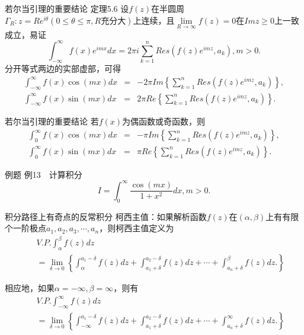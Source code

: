 \documentclass[11pt]{beamer}
\begin{document}
\begin{frame}{若尔当引理的重要结论}
定理5.6 设$f(z)$在半圆周$\Gamma_R : z=Re^{i\theta}(0 \leq \theta \leq \pi, R \text{充分大})$上连续，且$\lim\limits_{R \rightarrow \infty} f(z) = 0$在$Im z \geq 0$上一致成立，易证
\begin{equation}
\int^\infty_{-\infty} f(x) e^{imx} dx = 2\pi i \sum^n_{k=1} Res(f(z)e^{imz}, a_k), m>0.
\end{equation}
分开等式两边的实部虚部，可得
\begin{eqnarray}
\int^\infty_{-\infty} f(x) \cos(mx) dx &=& - 2\pi Im \left\{ \sum^n_{k=1} Res(f(z)e^{imz}, a_k) \right\},
\\
\int^\infty_{-\infty} f(x) \sin(mx) dx &=& 2\pi Re \left\{ \sum^n_{k=1} Res(f(z)e^{imz}, a_k) \right\}.
\end{eqnarray}
\end{frame}

\begin{frame}{若尔当引理的重要结论}
若$f(x)$为偶函数或奇函数，则
\begin{eqnarray}
\int^\infty_{0} f(x) \cos(mx) dx &=& - \pi Im \left\{ \sum^n_{k=1} Res(f(z)e^{imz}, a_k) \right\},
\\
\int^\infty_{0} f(x) \sin(mx) dx &=& \pi Re \left\{ \sum^n_{k=1} Res(f(z)e^{imz}, a_k) \right\}.
\end{eqnarray}
\end{frame}

\begin{frame}{例题}
例13　计算积分
\begin{equation}
I = \int^\infty_0 \frac{\cos (mx)}{1+x^2} dx, m>0.
\end{equation}
\end{frame}

\begin{frame}{积分路径上有奇点的反常积分}
柯西主值：如果解析函数$f(z)$在$(\alpha,\beta)$上有有限个一阶极点$a_1, a_2, a_3, \cdots, a_n$，则柯西主值定义为
\begin{eqnarray}
&&V.P.\int^\beta_\alpha f(z) dz \\
&&= \lim\limits_{\delta \rightarrow 0} \left\{ \int^{a_1 - \delta}_\alpha f(z) dz
+ \int^{a_2 - \delta}_{a_1 + \delta} f(z) dz
+ \cdots
+ \int^\beta_{a_n + \delta} f(z) dz.
  \right\} \nonumber
\end{eqnarray}

相应地，如果$\alpha = -\infty, \beta = \infty$，则有
\begin{eqnarray}
&&V.P.\int^\infty_{-\infty} f(z) dz \\
&&= \lim\limits_{\delta \rightarrow 0} \left\{ \int^{a_1 - \delta}_{-\infty} f(z) dz
+ \int^{a_2 - \delta}_{a_1 + \delta} f(z) dz
+ \cdots
+ \int^\infty_{a_n + \delta} f(z) dz.
  \right\} \nonumber
\end{eqnarray}
\end{frame}
\end{document}
